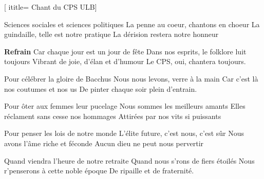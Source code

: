 [
ititle= {Chant du CPS ULB}]


\beginverse 
Sciences sociales et sciences politiques
La penne au coeur, chantons en choeur
La guindaille, telle est notre pratique
La dérision restera notre honneur
\endverse

\beginchorus
\textbf {Refrain}
Car chaque jour est un jour de fête
Dans nos esprits, le folklore luit toujours
Vibrant de joie, d'élan et d'humour
Le CPS, oui, chantera toujours.
\endchorus

\beginverse
Pour célébrer la gloire de Bacchus
Nous nous levons, verre à la main
Car c'est là nos coutumes et nos us
De pinter chaque soir plein d'entrain.
\endverse

\beginverse
Pour ôter aux femmes leur pucelage
Nous sommes les meilleurs amants
Elles réclament sans cesse nos hommages
Attirées par nos vits si puissants
\endverse

\beginverse
Pour penser les lois de notre monde
L'élite future, c'est nous, c'est sûr
Nous avons l'âme riche et féconde
Aucun dieu ne peut nous pervertir
\endverse

\beginverse
Quand viendra l'heure de notre retraite
Quand nous s'rons de fiers étoilés
Nous r'penserons à cette noble époque
De ripaille et de fraternité.
\endverse

\endsong